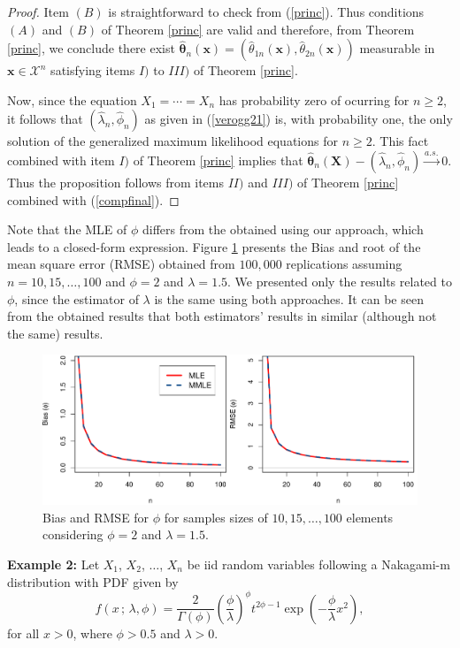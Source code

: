 \documentclass[12pt]{article} %
\newcommand{\bs}{\boldsymbol}
\theoremstyle{definition}
\begin{document}
\begin{proof}
Item $(B)$ is straightforward to check from (\ref{princ}). Thus conditions $(A)$ and $(B)$ of Theorem \ref{princ} are valid and therefore, from Theorem \ref{princ}, we conclude there exist $\bs{\hat{\theta}}_n(\bs{x})=(\hat{\theta}_{1n}(\bs{x}),\hat{\theta}_{2n}(\bs{x}))$ measurable in $\bs{x}\in \mathcal{X}^n$ satisfying items $I)$ to $III)$ of Theorem \ref{princ}.

 Now, since the equation $X_1=\cdots=X_n$ has probability zero of ocurring for $n\geq 2$, it follows that $(\hat\lambda_n,\hat\phi_n)$ as given in (\ref{verogg21}) is, with probability one, the only solution of the generalized maximum likelihood equations for $n\geq 2$.
This fact combined with item $I)$ of Theorem \ref{princ} implies that $\bs{\hat{\theta}}_n(\bs{X})-(\hat\lambda_n,\hat\phi_n)\overset{a.s.}{\to} 0$. Thus the proposition follows from items $II)$ and $III)$ of Theorem \ref{princ}  combined with (\ref{compfinal}).
\end{proof}

Note that the MLE of $\phi$ differs from the obtained using our approach, which leads to a closed-form expression. Figure \ref{fg1} presents the Bias and root of the mean square error (RMSE) obtained from $100,000$ replications assuming $n=10,15,\ldots,100$ and $\phi=2$ and $\lambda=1.5$. We presented only the results related to $\phi$, since the estimator of $\lambda$ is the same using both approaches. It can be seen from the obtained results that both estimators' results in similar (although not the same) results.
\begin{figure}[!ht]
\centering
\includegraphics[scale=0.6]{biasgamma.pdf}	
\caption{Bias and RMSE for $\phi$ for samples sizes of $10,15,\ldots,100$ elements considering $\phi=2$ and $\lambda=1.5$.}\label{fg1}
\end{figure}

\noindent\textbf{Example 2:} Let $X_1$, $X_2$, $\ldots$, $X_n$ be iid random variables following a Nakagami-m distribution with PDF given by
\begin{equation*}\label{fdpnk}
f(x\,;\,\lambda,\phi)=\frac{2}{\Gamma(\phi)}\left(\frac{\phi}{\lambda} \right)^\phi t^{2\phi-1}\exp\left(-\frac{\phi}{\lambda} x^2 \right), 
\end{equation*}
for all $x>0$, where $\phi> 0.5$ and $\lambda>0$.
\end{document}
